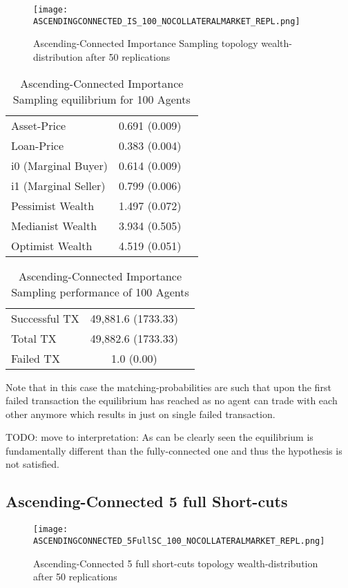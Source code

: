 \documentclass[Bachelorarbeit.tex]{subfiles}
\begin{document}
\begin{figure}[!htbp]
	\centering
  \texttt{[image: ASCENDINGCONNECTED\_IS\_100\_NOCOLLATERALMARKET\_REPL.png]}
	\caption{Ascending-Connected Importance Sampling topology wealth-distribution after 50 replications}
	\label{fig1}
\end{figure}

\begin{table}[h]
	\caption{Ascending-Connected Importance Sampling equilibrium for 100 Agents}
	\centering
	\begin{tabular} { l c r }
		\hline
		Asset-Price & 0.691 (0.009) \\
		Loan-Price & 0.383 (0.004) \\
		i0 (Marginal Buyer) & 0.614 (0.009) \\
		i1 (Marginal Seller) & 0.799 (0.006) \\
		Pessimist Wealth & 1.497 (0.072) \\
		Medianist Wealth & 3.934 (0.505) \\
		Optimist Wealth & 4.519 (0.051) \\
		\hline
	\end{tabular}
\end{table} 

\begin{table}[h]
	\caption{Ascending-Connected Importance Sampling performance of 100 Agents}
	\centering
	\begin{tabular} { l c r }
		\hline
		Successful TX & 49,881.6 (1733.33) \\
		Total TX & 49,882.6 (1733.33) \\
		Failed TX & 1.0 (0.00) \\
		\hline
	\end{tabular}
\end{table}

Note that in this case the matching-probabilities are such that upon the first failed transaction the equilibrium has reached as no agent can trade with each other anymore which results in just on single failed transaction.

TODO: move to interpretation: As can be clearly seen the equilibrium is fundamentally different than the fully-connected one and thus the hypothesis is not satisfied.

\subsection{Ascending-Connected 5 full Short-cuts }
\begin{figure}[!htbp]
	\centering
  \texttt{[image: ASCENDINGCONNECTED\_5FullSC\_100\_NOCOLLATERALMARKET\_REPL.png]}
	\caption{Ascending-Connected 5 full short-cuts topology wealth-distribution after 50 replications}
	\label{fig1}
\end{figure}
\end{document}
